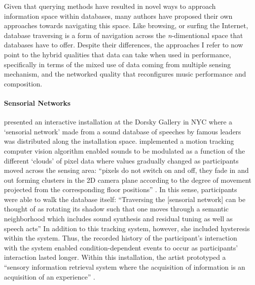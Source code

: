 Given that querying methods have resulted in novel ways to approach information space within databases, many authors have proposed their own approaches towards navigating this space. Like browsing, or surfing the Internet, database traversing is a form of navigation across the \textit{n}-dimentional space that databases have to offer. Despite their differences, the approaches I refer to now point to the hybrid qualities that data can take when used in performance, specifically in terms of the mixed use of data coming from multiple sensing mechanism, and the networked quality that reconfigures music performance and composition.

\paragraph{Sensorial Networks}
\textcite{Cho00:Voi, icmc/bbp2372.2000.146} presented an interactive installation at the Dorsky Gallery in NYC where a `sensorial network' made from a sound database of speeches by famous leaders was distributed along the installation space. \citeauthor{icmc/bbp2372.2000.146} implemented a motion tracking computer vision algorithm enabled sounds to be modulated as a function of the different `clouds' of pixel data where values gradually changed as participants moved across the sensing area: ``pixels do not switch on and off, they fade in and out forming clusters in the 2D camera plane according to the degree of movement projected from the corresponding floor positions'' \parencite[4]{icmc/bbp2372.2000.146}. In this sense, participants were able to walk the database itself: ``Traversing the [sensorial network] can be thought of as rotating its shadow such that one moves through a semantic neighborhood which includes sound synthesis and residual tuning as well as speech acts'' \parencite[3]{icmc/bbp2372.2000.146}	In addition to this tracking system, however, she included hysteresis within the system. Thus, the recorded history of the participant's interaction with the system enabled condition-dependent events to occur as participants' interaction lasted longer. Within this installation, the artist prototyped a ``sensory information retrieval system where the acquisition of information is an acquisition of an experience'' \parencite[1]{icmc/bbp2372.2000.146}.

